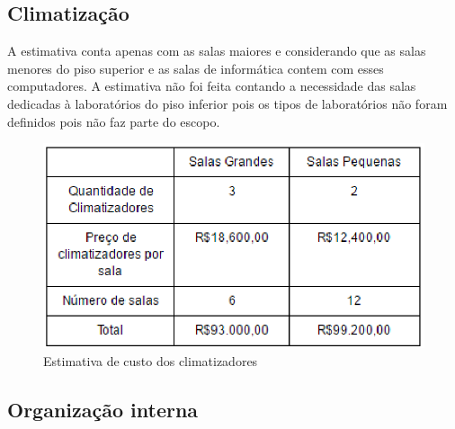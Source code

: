 \subsection{Climatização}
A estimativa conta apenas com as salas maiores e considerando que as salas menores do piso superior e as salas de informática contem com esses computadores. A estimativa não foi feita contando a necessidade das salas dedicadas à laboratórios do piso inferior pois os tipos de laboratórios não foram definidos pois não faz parte do escopo.  

\begin{figure}[!h]
\centering
\includegraphics[keepaspectratio=true,scale=1]{figuras/tabela_climatizadores.eps}
\caption{Estimativa de custo dos climatizadores}
\end{figure}

\subsection{Organização interna}
